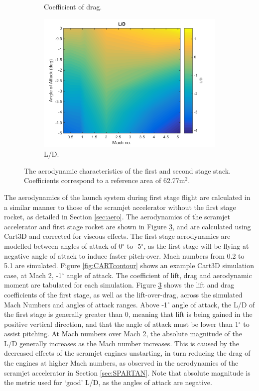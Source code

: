\begin{figure}[ht]
\begin{subfigure}{.5\textwidth}
    		\caption{Coefficient of drag.}
    		\label{fig:Cd-FirstStage}
    	\end{subfigure}
    	\begin{subfigure}{.5\textwidth}
    		\centering
    		\includegraphics[width=0.99\linewidth]{figures/3_vehicle_design/FirstStageLD}
    		\caption{L/D.}
    		\label{fig:LD-EFirstStage}
    	\end{subfigure}
    	\caption{The aerodynamic characteristics of the first and second stage stack.  Coefficients correspond to a reference area of 62.77m$^2$.}
    	\label{fig:FirstStageAero}
    \end{figure}
  The aerodynamics of the launch system during first stage flight are calculated in a similar manner to those of the scramjet accelerator without the first stage rocket, as detailed in Section \ref{sec:aero}. 
  The aerodynamics of the scramjet accelerator and first stage rocket are shown in Figure \ref{fig:FirstStageAero}, and are calculated using Cart3D and corrected for viscous effects. The first stage aerodynamics are modelled between angles of attack of 0$^\circ$ to -5$^\circ$, as the first stage will be flying at negative angle of attack to induce faster pitch-over. Mach numbers from 0.2 to 5.1 are simulated. Figure \ref{fig:CARTcontour} shows an example Cart3D simulation case, at Mach 2, -1$^\circ$ angle of attack. The coefficient of lift, drag and aerodynamic moment are tabulated for each simulation. Figure \ref{fig:FirstStageAero} shows the lift and drag coefficients of the first stage, as well as the lift-over-drag, across the simulated Mach Numbers and angles of attack ranges. Above -1$^\circ$ angle of attack, the L/D of the first stage is generally greater than 0, meaning that lift is being gained in the positive vertical direction, and that the angle of attack must be lower than 1$^\circ$ to assist pitching.
  At Mach numbers over Mach 2, the absolute magnitude of the L/D generally increases as the Mach number increases. This is caused by the decreased effects of the scramjet engines unstarting, in turn reducing the drag of the engines at higher Mach numbers, as observed in the aerodynamics of the scramjet accelerator in Section \ref{sec:SPARTAN}. 
   Note that absolute magnitude is the metric used for `good' L/D, as the angles of attack are negative. 
  
